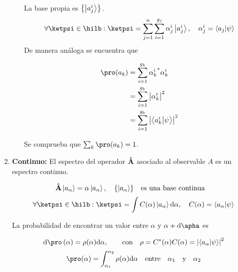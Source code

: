 \begin{enumerate}[\textbf{a)}]
\begin{itemize}
                     La base propia es $\qty{\ket{a_j^i}}$.
                     $$
                       \forall\ketpsi\in\hilb:\ketpsi=\sum_{j=1}^n\sum_{i=1}^{g_j} \alpha_j^i\ket{a_j^i}\qc \alpha_j^i=\braket{a_j}{\psi}
                     $$
                     De manera análoga se encuentra que

                     \begin{align*}
                       \pro(a_k) & =\sum_{i=1}^{g_k}{\alpha_k^i}^*\alpha_k^i     \\
                                 & =\sum_{i=1}^{g_k}\abs{\alpha_k^i}^2           \\
                                 & =\sum_{i=1}^{g_k}\abs{\braket{a_k^i}{\psi}}^2
                     \end{align*}

                     Se comprueba que $\sum_k\pro(a_k)=1$.
             \end{itemize}

       \item \textbf{Continuo:} El espectro del operador $\vu{A}$ asociado al observable $A$ es un espectro continuo.

             $$
               \vu{A}\ket{a_\alpha}=\alpha\ket{a_\alpha}\qc\qty{\ket{a_\alpha}}\qq{es una base continua}
             $$
             $$
               \forall\ketpsi\in\hilb:\ketpsi=\int C(\alpha)\ket{a_\alpha}\dd\alpha \qc C(\alpha)=\braket{a_\alpha}{\psi}
             $$

             La probabilidad de encontrar un valor entre $\alpha$ y $\alpha+\dd\apha$ es

             $$
               \dd\pro(\alpha)=\rho(\alpha)\dd\alpha\qc\qq{con}\rho=C^*(\alpha)C(\alpha)=\abs{\braket{a_\alpha}{\psi}}^2
             $$
             $$
               \pro(\alpha)=\int_{\alpha_1}^{\alpha_2}\rho(\alpha)\dd\alpha\qq{entre}\alpha_1\qq{y}\alpha_2
             $$
     \end{enumerate}

